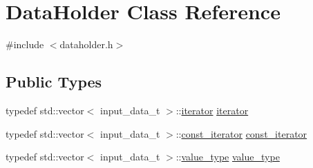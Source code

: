 \hypertarget{classDataHolder}{}\section{Data\+Holder Class Reference}
\label{classDataHolder}


{\ttfamily \#include $<$dataholder.\+h$>$}

\subsection*{Public Types}
\begin{DoxyCompactItemize}
\item 
typedef std\+::vector$<$ input\+\_\+data\+\_\+t $>$\+::\hyperlink{classDataHolder_afc27d248b4761952f2318a18ad5a2a15}{iterator} \hyperlink{classDataHolder_afc27d248b4761952f2318a18ad5a2a15}{iterator}
\item 
typedef std\+::vector$<$ input\+\_\+data\+\_\+t $>$\+::\hyperlink{classDataHolder_a396f5981e656ed389de16190968a2bf8}{const\+\_\+iterator} \hyperlink{classDataHolder_a396f5981e656ed389de16190968a2bf8}{const\+\_\+iterator}
\item 
typedef std\+::vector$<$ input\+\_\+data\+\_\+t $>$\+::\hyperlink{classDataHolder_a01e6e078bc49ab1098ae5ea954f9493e}{value\+\_\+type} \hyperlink{classDataHolder_a01e6e078bc49ab1098ae5ea954f9493e}{value\+\_\+type}
\end{DoxyCompactItemize}
